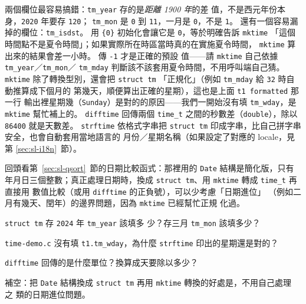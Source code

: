 
兩個欄位最容易搞錯：\texttt{tm\_year} 存的是\textit{距離 1900 年}的差
值，不是西元年份本身，\texttt{2020} 年要存 \texttt{120}；
\texttt{tm\_mon} 是 \texttt{0} 到 \texttt{11}，一月是 \texttt{0}，不是
\texttt{1}。 還有一個容易漏掉的欄位：\texttt{tm\_isdst}。 用
\texttt{\{0\}} 初始化會讓它是 \texttt{0}，等於明確告訴 \texttt{mktime}
「這個時間點不是夏令時間」；如果實際所在時區當時真的在實施夏令時間，
\texttt{mktime} 算出來的結果會差一小時。 傳 \texttt{-1} 才是正確的預設
值——請 \texttt{mktime} 自己依據 \texttt{tm\_year}／\texttt{tm\_mon}／
\texttt{tm\_mday} 判斷該不該套用夏令時間，不用呼叫端自己猜。
\texttt{mktime} 除了轉換型別，還會把 \texttt{struct tm}
「正規化」（例如 \texttt{tm\_mday} 給 \texttt{32} 時自動推算成下個月的
第幾天，順便算出正確的星期），這也是上面 \texttt{t1 formatted} 那一行
輸出裡星期幾（\texttt{Sunday}）是對的的原因——我們一開始沒有填
\texttt{tm\_wday}，是 \texttt{mktime} 幫忙補上的。 \texttt{difftime}
回傳兩個 \texttt{time\_t} 之間的秒數差（\texttt{double}），除以
\texttt{86400} 就是天數差。 \texttt{strftime} 依格式字串把
\texttt{struct tm} 印成字串，比自己拼字串安全，也會自動套用當地語言的
月份／星期名稱（如果設定了對應的 locale，見第
\ref{sec:sl-i18n}~節）。

回頭看第~\ref{sec:sl-qsort}~節的日期比較函式：那裡用的
\texttt{Date} 結構是簡化版，只有年月日三個整數；真正處理日期時，換成
\texttt{struct tm}、用 \texttt{mktime} 轉成 \texttt{time\_t} 再直接用
數值比較（或用 \texttt{difftime} 的正負號），可以少考慮「日期進位」
（例如二月有幾天、閏年）的邊界問題，因為 \texttt{mktime} 已經幫忙正規
化過。


\begin{drills}[label=drills:sl-time]
\item \texttt{struct tm} 存 \texttt{2024} 年 \texttt{tm\_year} 該填多
少？存三月 \texttt{tm\_mon} 該填多少？
\item \texttt{time-demo.c} 沒有填 \texttt{t1.tm\_wday}，為什麼
\texttt{strftime} 印出的星期還是對的？
\item \texttt{difftime} 回傳的是什麼單位？換算成天要除以多少？
\item 補空：把 \texttt{Date} 結構換成 \texttt{struct tm} 再用
\texttt{mktime} 轉換的好處是，不用自己處理 \underline{\hspace{2em}} 之
類的日期進位問題。
\end{drills}

